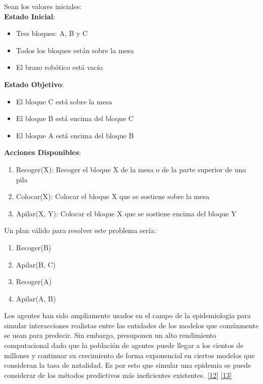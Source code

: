         Sean los valores iniciales: \\

        \textbf{ Estado Inicial}:
        \begin{itemize}
        \item  Tres bloques: A, B y C
        \item  Todos los bloques están sobre la mesa
        \item  El brazo robótico está vacío \\
        \end{itemize}

        \textbf{ Estado Objetivo}:
        \begin{itemize}
        \item  El bloque C está sobre la mesa
        \item  El bloque B está encima del bloque C
        \item  El bloque A está encima del bloque B \\

        \end{itemize}

        \textbf{Acciones Disponibles}:
        \begin{enumerate}

        \item  Recoger(X): Recoger el bloque X de la mesa o de la parte superior de una pila
        \item  Colocar(X): Colocar el bloque X que se sostiene sobre la mesa
        \item  Apilar(X, Y): Colocar el bloque X que se sostiene encima del bloque Y \\

        \end{enumerate}

        Un plan válido para resolver este problema sería:
        \begin{enumerate}

        \item  Recoger(B)
        \item  Apilar(B, C)
        \item  Recoger(A)
        \item  Apilar(A, B)
        \end{enumerate}

    Los agentes han sido ampliamente usados en el campo de la epidemiologia para simular interacciones realistas entre las entidades de los modelos que comúnmente se usan para predecir. Sin embargo, presuponen un alto rendimiento computacional dado que la población de agentes puede llegar a los cientos de millones y continuar su crecimiento de forma exponencial en ciertos modelos que consideran la tasa de natalidad. Es por esto que simular una epidemia se puede considerar de los métodos predictivos más ineficientes existentes. \hyperref[sec:22]{[12]} \hyperref[sec:23]{[13]}

